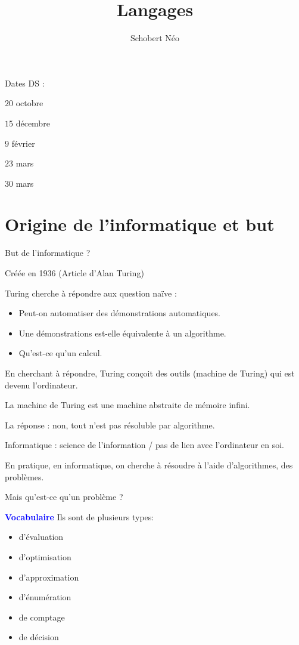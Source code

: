 \documentclass[a4paper, 11pt, hidelinks]{article}
\newcommand{\bs}{\bigskip}
\newcommand{\voca}{\textcolor{blue}{\textbf{Vocabulaire} } }
\begin{document}
\title{Langages}
\author{Schobert Néo}

\maketitle

\tableofcontents


\newpage 

\large Dates DS : \large

$20$ octobre

$15$ décembre

$9$ février

$23$ mars

$30$ mars



\section{Origine de l'informatique et but}
But de l'informatique ?


Créée en 1936 (Article d'Alan Turing)


Turing cherche à répondre aux question naïve :

\begin{itemize}
\item Peut-on automatiser des démonstrations automatiques.
\item Une démonstrations est-elle équivalente à un algorithme.
\item Qu'est-ce qu'un calcul.
\end{itemize}

En cherchant à répondre, Turing conçoit des outils (machine de Turing) qui est devenu l'ordinateur.


La machine de Turing est une machine abstraite de mémoire infini.


La réponse : non, tout n'est pas résoluble par algorithme.


Informatique : science de l'information / pas de lien avec l'ordinateur en soi.


\bs

En pratique, en informatique, on cherche à résoudre à l'aide d'algorithmes, des problèmes.

Mais qu'est-ce qu'un problème ?

\voca Ils sont de plusieurs types:

\begin{itemize}
    \item d'évaluation
    \item d'optimisation
    \item d'approximation
    \item d'énumération
    \item de comptage
    \item de décision
\end{itemize}
\end{document}
